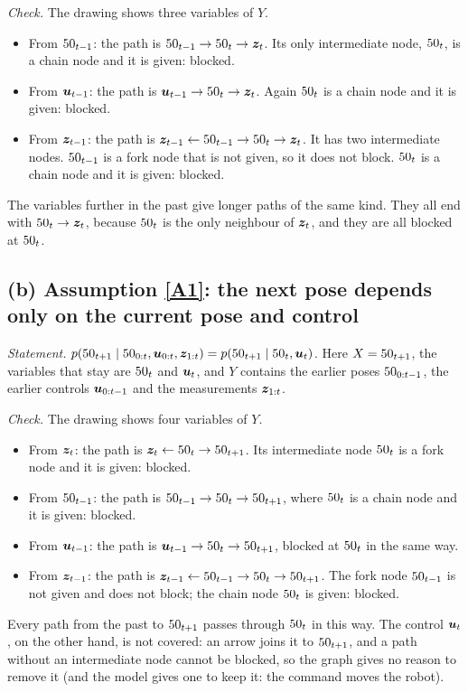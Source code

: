 \begin{center}

\end{center}

\emph{Check.} The drawing shows three variables of $Y$.
\begin{itemize}[nosep]
  \item From $50_{t-1}$: the path is $50_{t-1}\rightarrow50_t\rightarrow
    \bm{z}_t$. Its only intermediate node, $50_t$, is a chain node and it is
    given: blocked.
  \item From $\bm{u}_{t-1}$: the path is $\bm{u}_{t-1}\rightarrow50_t\rightarrow
    \bm{z}_t$. Again $50_t$ is a chain node and it is given: blocked.
  \item From $\bm{z}_{t-1}$: the path is $\bm{z}_{t-1}\leftarrow50_{t-1}
    \rightarrow50_t\rightarrow\bm{z}_t$. It has two intermediate nodes.
    $50_{t-1}$ is a fork node that is not given, so it does not block.
    $50_t$ is a chain node and it is given: blocked.
\end{itemize}
The variables further in the past give longer paths of the same kind.
They all end with $50_t\rightarrow\bm{z}_t$, because $50_t$ is the only
neighbour of $\bm{z}_t$, and they are all blocked at $50_t$.

\subsection*{(b) Assumption \ref{A1}: the next pose depends only on the
current pose and control}

\emph{Statement.}
$p(50_{t+1}\mid50_{0:t},\bm{u}_{0:t},\bm{z}_{1:t})=p(50_{t+1}\mid50_t,\bm{u}_t)$.
Here $X=50_{t+1}$, the variables that stay are $50_t$ and $\bm{u}_t$, and $Y$
contains the earlier poses $50_{0:t-1}$, the earlier controls
$\bm{u}_{0:t-1}$ and the measurements $\bm{z}_{1:t}$.

\begin{center}

\end{center}

\emph{Check.} The drawing shows four variables of $Y$.
\begin{itemize}[nosep]
  \item From $\bm{z}_t$: the path is $\bm{z}_t\leftarrow50_t\rightarrow50_{t+1}$.
    Its intermediate node $50_t$ is a fork node and it is given: blocked.
  \item From $50_{t-1}$: the path is $50_{t-1}\rightarrow50_t\rightarrow
    50_{t+1}$, where $50_t$ is a chain node and it is given: blocked.
  \item From $\bm{u}_{t-1}$: the path is $\bm{u}_{t-1}\rightarrow50_t\rightarrow
    50_{t+1}$, blocked at $50_t$ in the same way.
  \item From $\bm{z}_{t-1}$: the path is $\bm{z}_{t-1}\leftarrow50_{t-1}
    \rightarrow50_t\rightarrow50_{t+1}$. The fork node $50_{t-1}$ is not
    given and does not block; the chain node $50_t$ is given: blocked.
\end{itemize}
Every path from the past to $50_{t+1}$ passes through $50_t$ in this way.
The control $\bm{u}_t$, on the other hand, is not covered: an arrow joins it
to $50_{t+1}$, and a path without an intermediate node cannot be blocked,
so the graph gives no reason to remove it (and the model gives one to keep
it: the command moves the robot).

